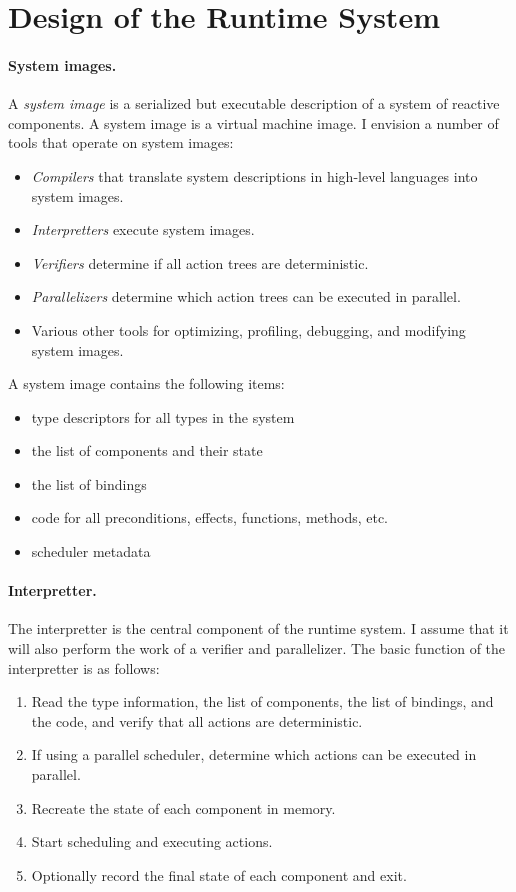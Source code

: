 \section{Design of the Runtime System \label{design}}

\paragraph{System images.}
A \emph{system image} is a serialized but executable description of a system of reactive components.
A system image is a virtual machine image.
I envision a number of tools that operate on system images:
\begin{itemize}
\item \emph{Compilers} that translate system descriptions in high-level languages into system images.
\item \emph{Interpretters} execute system images.
\item \emph{Verifiers} determine if all action trees are deterministic.
\item \emph{Parallelizers} determine which action trees can be executed in parallel.
\item Various other tools for optimizing, profiling, debugging, and modifying system images.
\end{itemize}

A system image contains the following items:
\begin{itemize}
\item type descriptors for all types in the system
\item the list of components and their state
\item the list of bindings
\item code for all preconditions, effects, functions, methods, etc.
\item scheduler metadata
\end{itemize}

\paragraph{Interpretter.}
The interpretter is the central component of the runtime system.
I assume that it will also perform the work of a verifier and parallelizer.
The basic function of the interpretter is as follows:
\begin{enumerate}
\item Read the type information, the list of components, the list of bindings, and the code, and verify that all actions are deterministic.
\item If using a parallel scheduler, determine which actions can be executed in parallel.
\item Recreate the state of each component in memory.
\item Start scheduling and executing actions.
\item Optionally record the final state of each component and exit.
\end{enumerate}


